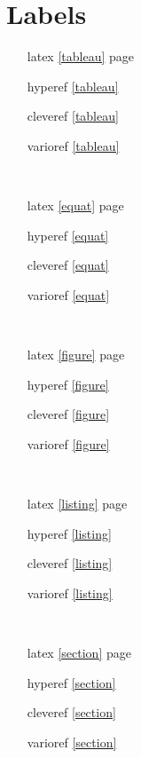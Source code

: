 \section{Labels}


\begin{itemize}
    \item[latex] \ref{tableau} page \pageref{tableau}
    \item[hyperef]  \autoref{tableau} 
    \item[cleveref] \cref{tableau} 
    \item[varioref] \vref{tableau}
\end{itemize}

~~

\begin{itemize}
    \item[latex] \ref{equat} page \pageref{equat}
    \item[hyperef]  \autoref{equat} 
    \item[cleveref] \cref{equat} 
    \item[varioref] \vref{equat}
\end{itemize}

~~

\begin{itemize}
    \item[latex] \ref{figure} page \pageref{figure}
    \item[hyperef]  \autoref{figure} 
    \item[cleveref] \cref{figure} 
    \item[varioref] \vref{figure}
\end{itemize}

~~

\begin{itemize}
    \item[latex] \ref{listing} page \pageref{listing}
    \item[hyperef]  \autoref{listing} 
    \item[cleveref] \cref{listing} 
    \item[varioref] \vref{listing}
\end{itemize}

~~

\begin{itemize}
    \item[latex] \ref{section} page \pageref{section}
    \item[hyperef]  \autoref{section} 
    \item[cleveref] \cref{section} 
    \item[varioref] \vref{section}
\end{itemize}

